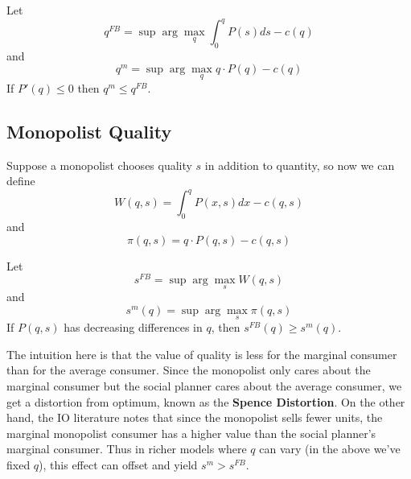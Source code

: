 \begin{prop}
  Let
  \[
  q^{FB} = \sup \arg \max_q \int_0^q P(s) ds - c(q)
  \]
  and
  \[
  q^m = \sup \arg \max_q q \cdot P(q) - c(q)
  \]
  If $P'(q) \leq 0$ then $q^m \leq q^{FB}$.
\end{prop}



\subsection{Monopolist Quality}
\label{sec:monopolist-quality}

Suppose a monopolist chooses quality $s$ in addition to quantity, so
now we can define
\[
W(q,s) = \int_0^q P(x,s) dx - c(q,s)
\]
and
\[
\pi(q,s) = q \cdot P(q,s) - c(q,s)
\]

\begin{prop}
  Let 
  \[
  s^{FB} = \sup \arg \max_s W(q,s)
  \]
  and
  \[
  s^m(q) = \sup \arg \max_s \pi(q,s)
  \]
  If $P(q,s)$ has decreasing differences in $q$, then $s^{FB}(q) \geq
  s^m(q)$.
\end{prop}

The intuition here is that the value of quality is less for the
marginal consumer than for the average consumer. Since the monopolist
only cares about the marginal consumer but the social planner cares
about the average consumer, we get a distortion from optimum, known as
the \textbf{Spence Distortion}. On the other hand, the IO literature
notes that since the monopolist sells fewer units, the marginal
monopolist consumer has a higher value than the social planner's
marginal consumer. Thus in richer models where $q$ can vary (in the
above we've fixed $q$), this effect can offset and yield $s^m >
s^{FB}$.





